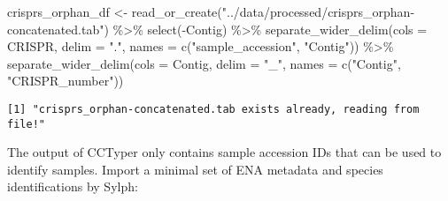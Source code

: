 \documentclass[
  twocolumn,
  landscape]{report}
\newenvironment{Shaded}{}{}
\newcommand{\AttributeTok}[1]{\textcolor[rgb]{0.84,0.23,0.29}{#1}}
\newcommand{\FunctionTok}[1]{\textcolor[rgb]{0.44,0.26,0.76}{#1}}
\newcommand{\NormalTok}[1]{\textcolor[rgb]{0.14,0.16,0.18}{#1}}
\newcommand{\OtherTok}[1]{\textcolor[rgb]{0.44,0.26,0.76}{#1}}
\newcommand{\SpecialCharTok}[1]{\textcolor[rgb]{0.00,0.36,0.77}{#1}}
\newcommand{\StringTok}[1]{\textcolor[rgb]{0.01,0.18,0.38}{#1}}
\begin{document}
\begin{Shaded}
\begin{Highlighting}[]
\NormalTok{crisprs\_orphan\_df }\OtherTok{\textless{}{-}} \FunctionTok{read\_or\_create}\NormalTok{(}\StringTok{"../data/processed/crisprs\_orphan{-}concatenated.tab"}\NormalTok{) }\SpecialCharTok{\%\textgreater{}\%}
  \FunctionTok{select}\NormalTok{(}\SpecialCharTok{{-}}\NormalTok{Contig) }\SpecialCharTok{\%\textgreater{}\%}
  \FunctionTok{separate\_wider\_delim}\NormalTok{(}\AttributeTok{cols =}\NormalTok{ CRISPR, }\AttributeTok{delim =} \StringTok{"."}\NormalTok{,}
                       \AttributeTok{names =} \FunctionTok{c}\NormalTok{(}\StringTok{"sample\_accession"}\NormalTok{, }\StringTok{"Contig"}\NormalTok{)) }\SpecialCharTok{\%\textgreater{}\%}
  \FunctionTok{separate\_wider\_delim}\NormalTok{(}\AttributeTok{cols =}\NormalTok{ Contig, }\AttributeTok{delim =} \StringTok{"\_"}\NormalTok{,}
                       \AttributeTok{names =} \FunctionTok{c}\NormalTok{(}\StringTok{"Contig"}\NormalTok{, }\StringTok{"CRISPR\_number"}\NormalTok{))}
\end{Highlighting}
\end{Shaded}

\begin{verbatim}
[1] "crisprs_orphan-concatenated.tab exists already, reading from file!"
\end{verbatim}

The output of CCTyper only contains sample accession IDs that can be
used to identify samples. Import a minimal set of ENA metadata and
species identifications by Sylph:
\end{document}
